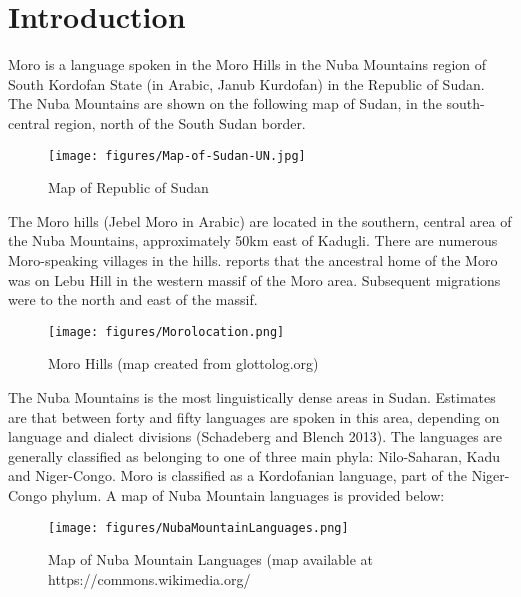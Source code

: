 \chapter{Introduction}\label{chapter:introduction}


Moro is a language spoken in the Moro Hills in the Nuba Mountains region of South Kordofan State (in Arabic,  Janub Kurdofan) in the Republic of Sudan. The Nuba Mountains are shown on the following map of Sudan, in the south-central region, north of the South Sudan border. 

\begin{figure}
  \texttt{[image: figures/Map-of-Sudan-UN.jpg]}
    \caption{Map of Republic of Sudan}
  \label{fig:1-1}
\end{figure}

The Moro hills (Jebel Moro in Arabic) are located in the southern, central area of the Nuba Mountains,  approximately 50km east of Kadugli. There are numerous Moro-speaking villages in the hills. \citep{nadel47} reports that the ancestral home of the Moro was on Lebu Hill in the western massif of the Moro area. Subsequent migrations were to the north and east of the massif.

\begin{figure}
  \texttt{[image: figures/Morolocation.png]}
    \caption{Moro Hills (map created from glottolog.org)}
  \label{fig:1-1}
\end{figure}

The Nuba Mountains is the most linguistically dense areas in Sudan. Estimates are that between forty and fifty languages are spoken in this area, depending on language and dialect divisions (Schadeberg and Blench 2013). The languages are generally classified as belonging to one of three main phyla: Nilo-Saharan, Kadu and Niger-Congo. Moro is classified as a Kordofanian language, part of the Niger-Congo phylum. A map of Nuba Mountain languages is provided below:

\begin{figure}
  \texttt{[image: figures/NubaMountainLanguages.png]}
    \caption{Map of Nuba Mountain Languages (map available at https://commons.wikimedia.org/}
  \label{fig:1-1}
\end{figure}


